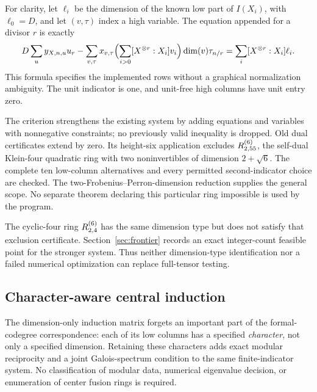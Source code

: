 For clarity, let $\ell_i$ be the dimension of the known low part of
$I(X_i)$, with $\ell_0=D$, and let $(v,\tau)$ index a high variable.
The equation appended for a divisor $r$ is exactly
\begin{equation}\label{eq:rotation-row}
 D\sum_u y_{X,n,u}u_r
 -\sum_{v,\tau}x_{v,\tau}\Bigl(\sum_{i>0}[X^{\otimes r}:X_i]v_i\Bigr)
                 \dim(v)\tau_{n/r}
 =\sum_i[X^{\otimes r}:X_i]\ell_i.
\end{equation}
This formula specifies the implemented rows without a graphical
normalization ambiguity. The unit indicator is one, and unit-free high
columns have unit entry zero.

The criterion strengthens the existing system by adding equations and
variables with nonnegative constraints; no previously valid inequality
is dropped. Old dual certificates extend by zero. Its height-six
application excludes $R^{(6)}_{2,55}$, the self-dual Klein-four quadratic
ring with two noninvertibles of dimension $2+\sqrt6$. The complete ten
low-column alternatives and every permitted second-indicator choice
are checked. The two-Frobenius--Perron-dimension reduction supplies the
general scope. No separate theorem declaring this particular ring
impossible is used by the program.

The cyclic-four ring $R^{(6)}_{2,4}$ has the same dimension type but does not
satisfy that exclusion certificate. Section~\ref{sec:frontier} records
an exact integer-count feasible point for the stronger system. Thus
neither dimension-type identification nor a failed numerical optimization
can replace full-tensor testing.

\subsection{Character-aware central induction}\label{sec:character-induction}
The dimension-only induction matrix forgets an important part of the
formal-codegree correspondence: each of its low columns has a specified
\emph{character}, not only a specified dimension. Retaining these
characters adds exact modular reciprocity and a joint Galois-spectrum
condition to the same finite-indicator system. No classification of
modular data, numerical eigenvalue decision, or enumeration of center
fusion rings is required.

